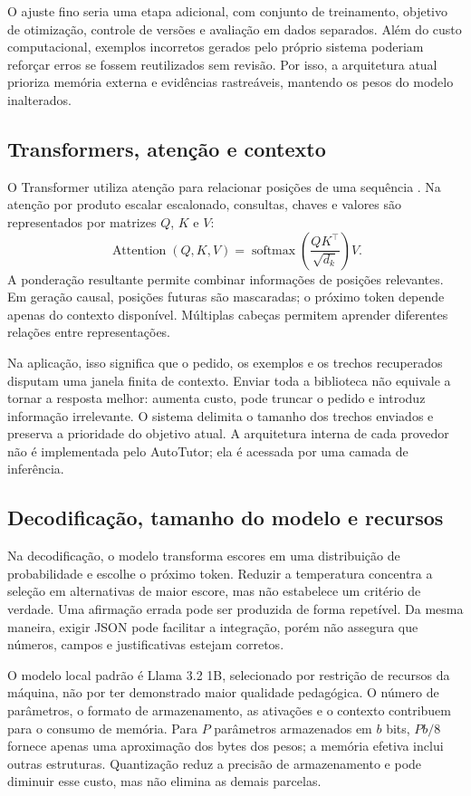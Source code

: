 \documentclass[12pt]{article}
\begin{document}
O ajuste fino seria uma etapa adicional, com conjunto de treinamento, objetivo de otimização, controle de versões e avaliação em dados separados. Além do custo computacional, exemplos incorretos gerados pelo próprio sistema poderiam reforçar erros se fossem reutilizados sem revisão. Por isso, a arquitetura atual prioriza memória externa e evidências rastreáveis, mantendo os pesos do modelo inalterados.

\subsection{Transformers, atenção e contexto}
O Transformer utiliza atenção para relacionar posições de uma sequência \cite{vaswani2017}. Na atenção por produto escalar escalonado, consultas, chaves e valores são representados por matrizes $Q$, $K$ e $V$:
\begin{equation}
 \operatorname{Attention}(Q,K,V)=\operatorname{softmax}\!\left(\frac{QK^\top}{\sqrt{d_k}}\right)V.
\end{equation}
A ponderação resultante permite combinar informações de posições relevantes. Em geração causal, posições futuras são mascaradas; o próximo token depende apenas do contexto disponível. Múltiplas cabeças permitem aprender diferentes relações entre representações.

Na aplicação, isso significa que o pedido, os exemplos e os trechos recuperados disputam uma janela finita de contexto. Enviar toda a biblioteca não equivale a tornar a resposta melhor: aumenta custo, pode truncar o pedido e introduz informação irrelevante. O sistema delimita o tamanho dos trechos enviados e preserva a prioridade do objetivo atual. A arquitetura interna de cada provedor não é implementada pelo AutoTutor; ela é acessada por uma camada de inferência.

\subsection{Decodificação, tamanho do modelo e recursos}
Na decodificação, o modelo transforma escores em uma distribuição de probabilidade e escolhe o próximo token. Reduzir a temperatura concentra a seleção em alternativas de maior escore, mas não estabelece um critério de verdade. Uma afirmação errada pode ser produzida de forma repetível. Da mesma maneira, exigir JSON pode facilitar a integração, porém não assegura que números, campos e justificativas estejam corretos.

O modelo local padrão é Llama 3.2 1B, selecionado por restrição de recursos da máquina, não por ter demonstrado maior qualidade pedagógica. O número de parâmetros, o formato de armazenamento, as ativações e o contexto contribuem para o consumo de memória. Para $P$ parâmetros armazenados em $b$ bits, $Pb/8$ fornece apenas uma aproximação dos bytes dos pesos; a memória efetiva inclui outras estruturas. Quantização reduz a precisão de armazenamento e pode diminuir esse custo, mas não elimina as demais parcelas.
\end{document}
